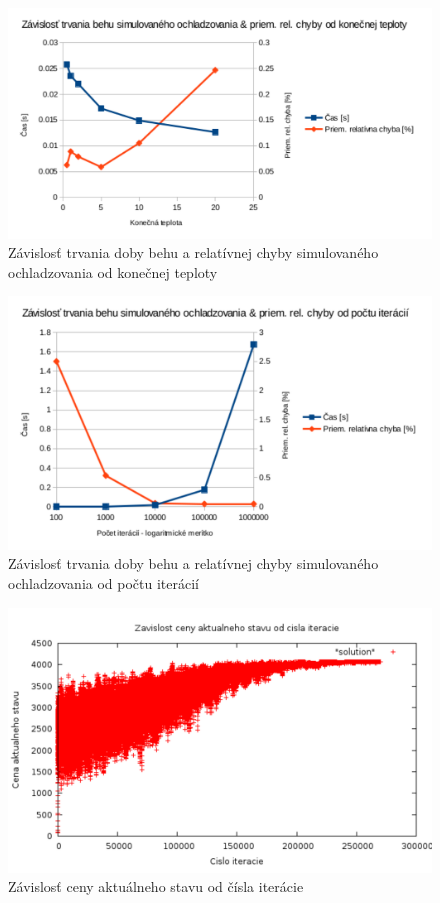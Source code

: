 \documentclass[slovak]{article}
\begin{document}
\begin{figure}[htb!]\centering
	\includegraphics[scale=0.8]{./4_3.pdf}
	\caption{Závislosť trvania doby behu a relatívnej chyby simulovaného ochladzovania od konečnej teploty}
	\label{gr:graf3}
\end{figure}

\begin{figure}[htb!]\centering
	\includegraphics[scale=0.8]{./4_4.pdf}
	\caption{Závislosť trvania doby behu a relatívnej chyby simulovaného ochladzovania od počtu iterácií}
	\label{gr:graf4}
\end{figure}

\begin{figure}[htb!]\centering
	\includegraphics[scale=0.6]{./4_5.pdf}
	\caption{Závislosť ceny aktuálneho stavu od čísla iterácie}
	\label{gr:graf5}
\end{figure}
\end{document}
